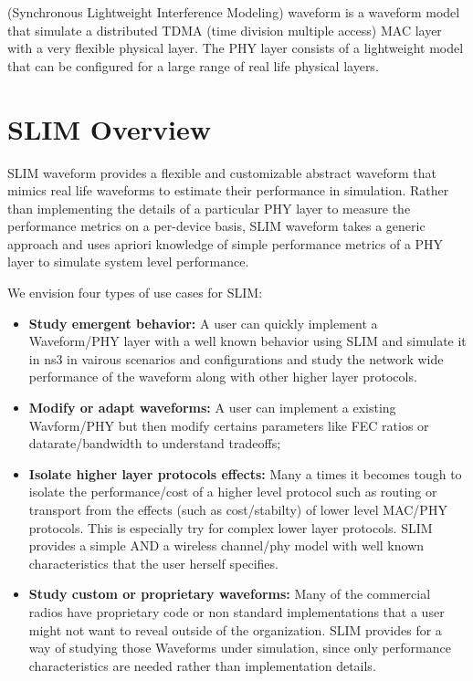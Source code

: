 (Synchronous Lightweight Interference Modeling) waveform is a waveform model that simulate a distributed TDMA (time division multiple access) MAC layer with a very flexible physical layer. 
The PHY layer consists of a lightweight model that can be configured for a large range of real life physical layers.



\section{SLIM Overview}
SLIM waveform provides a flexible and customizable abstract waveform that mimics real life waveforms to estimate their performance in simulation. Rather than implementing the details of a particular PHY layer to measure the performance metrics on a per-device basis, SLIM waveform takes a generic approach and uses apriori knowledge of simple performance metrics of a PHY layer to simulate system level performance.

We envision four types of use cases for SLIM:
\begin{itemize}
	\item \textbf{Study emergent behavior:} A user can quickly implement a Waveform/PHY layer with a  well known behavior using SLIM and simulate it in ns3 in vairous scenarios and configurations and study the network wide performance of the waveform along with other higher layer protocols.
	\item \textbf{Modify or adapt waveforms:} A user can implement a existing Wavform/PHY but then modify certains parameters like FEC ratios or datarate/bandwidth to understand tradeoffs; 
	\item \textbf{Isolate higher layer protocols effects:} Many a times it becomes tough to isolate the performance/cost of a higher level protocol such as routing or transport from the effects (such as cost/stabilty) of lower level MAC/PHY protocols. This is especially try for complex lower layer protocols. SLIM provides a simple AND a wireless channel/phy model with well known characteristics that the user herself specifies.
	\item \textbf{Study custom or proprietary waveforms:} Many of the commercial radios have proprietary code or non standard implementations that a user might not want to reveal outside of the organization. SLIM provides for a way of studying those Waveforms under simulation, since only performance characteristics are needed rather than implementation details.
\end{itemize}

